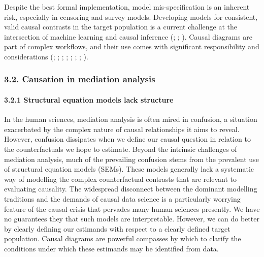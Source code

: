 \documentclass[
  singlecolumn]{article}
\let\oldparagraph\paragraph
\renewcommand{\paragraph}[1]{\oldparagraph{#1}\mbox{}}
\begin{document}
Despite the best formal implementation, model mis-specification is an
inherent risk, especially in censoring and survey models. Developing
models for consistent, valid causal contrasts in the target population
is a current challenge at the intersection of machine learning and
causal inference (; ;
). Causal
diagrams are part of complex workflows, and their use comes with
significant responsibility and considerations
(;
;
;
;
;
;
;
).

\subsubsection{3.2. Causation in mediation
analysis}\label{causation-in-mediation-analysis}

\paragraph{3.2.1 Structural equation models lack
structure}\label{structural-equation-models-lack-structure}

In the human sciences, mediation analysis is often mired in confusion, a
situation exacerbated by the complex nature of causal relationships it
aims to reveal. However, confusion dissipates when we define our causal
question in relation to the counterfactuals we hope to estimate. Beyond
the intrinsic challenges of mediation analysis, much of the prevailing
confusion stems from the prevalent use of structural equation models
(SEMs). These models generally lack a systematic way of modelling the
complex counterfactual contrasts that are relevant to evaluating
causality. The widespread disconnect between the dominant modelling
traditions and the demands of causal data science is a particularly
worrying feature of the causal crisis that pervades many human sciences
presently. We have no guarantees they that such models are
interpretable. However, we can do better by clearly defining our
estimands with respect to a clearly defined target population. Causal
diagrams are powerful compasses by which to clarify the conditions under
which these estimands may be identified from data.
\end{document}
